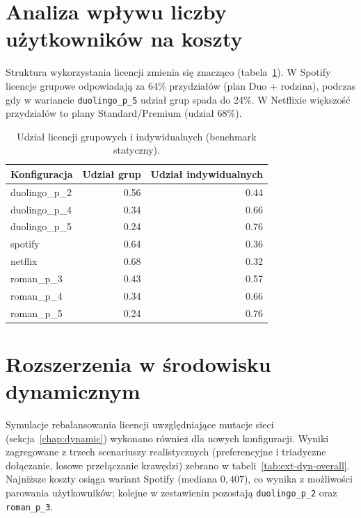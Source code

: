 \section{Analiza wpływu liczby użytkowników na koszty}

Struktura wykorzystania licencji zmienia się znacząco (tabela~\ref{tab:ext-license-mix}). W Spotify licencje grupowe odpowiadają za 64\% przydziałów (plan Duo + rodzina), podczas gdy w wariancie \texttt{duolingo\_p\_5} udział grup spada do 24\%. W Netflixie większość przydziałów to plany Standard/Premium (udział 68\%).

\begin{table}[H]
  \centering
  \caption{Udział licencji grupowych i indywidualnych (benchmark statyczny).}
  \label{tab:ext-license-mix}
  \begin{tabular}{lrr}
    \toprule
    \textbf{Konfiguracja} & \textbf{Udział grup} & \textbf{Udział indywidualnych} \\
    \midrule
    duolingo\_p\_2        & 0.56                 & 0.44                           \\
    duolingo\_p\_4        & 0.34                 & 0.66                           \\
    duolingo\_p\_5        & 0.24                 & 0.76                           \\
    spotify               & 0.64                 & 0.36                           \\
    netflix               & 0.68                 & 0.32                           \\
    roman\_p\_3           & 0.43                 & 0.57                           \\
    roman\_p\_4           & 0.34                 & 0.66                           \\
    roman\_p\_5           & 0.24                 & 0.76                           \\
  \end{tabular}
\end{table}

\section{Rozszerzenia w środowisku dynamicznym}

Symulacje rebalansowania licencji uwzględniające mutacje sieci (sekcja~\ref{chap:dynamic}) wykonano również dla nowych konfiguracji. Wyniki zagregowane z trzech scenariuszy realistycznych (preferencyjne i triadyczne dołączanie, losowe przełączanie krawędzi) zebrano w tabeli~\ref{tab:ext-dyn-overall}. Najniższe koszty osiąga wariant Spotify (mediana $0{,}407$), co wynika z możliwości parowania użytkowników; kolejne w zestawieniu pozostają \texttt{duolingo\_p\_2} oraz \texttt{roman\_p\_3}.

